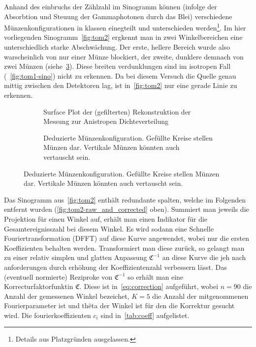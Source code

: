 \documentclass[slug=PET, room=Andreas-Schubert-Bau\,\ 424A, supervisor=Carsten\ Bittrich, coursedate=10.\ 01.\ 2020]{../../Lab_Report_LaTeX/lab_report}
\begin{document}
Anhand des einbruchs der Z\"ahlzahl im Sinogramm k\"onnen (infolge der
Absorbtion und Steuung der Gammaphotonen durch das Blei) verschiedene
M\"unzenkonfigurationen in klassen einegteilt und unterschieden
werden\footnote{Details aus Platzgr\"unden ausgelassen.}. Im hier
vorliegenden Sinogramm~\ref{fig:tom2} ergkennt man in zwei
Winkelbereichen eine unterschiedlich starke Abschw\"achung. Der erste,
hellere Bereich wurde also warscheinlich von nur einer M\"unze
blockiert, der zweite, dunklere demnach von zwei M\"unzen
(siehe~\ref{fig:munzen}). Diese breiten verdunklungen sind im
isotropen Fall (~\ref{fig:tom1-sino}) nicht zu erkennen. Da bei diesem
Versuch die Quelle genau mittig zwischen den Detektoren lag, ist
in~\ref{fig:tom2} nur eine gerade Linie zu erkennen.
\begin{figure}[h]
  \centering
  \begin{subfigure}{.4\textwidth}
    \centering
    \resizebox{0.8\textwidth}{!}{
      
    }
    \caption{Surface Plot der (gefilterten) Rekonstruktion der Messung zur Anistropen Dichteverteilung}
    \label{fig:tom2-3dplot}
  \end{subfigure}
  \begin{subfigure}{.4\textwidth}
    \centering

    \caption[M\"unzkonfiguration]{Deduzierte
      M\"unzenkonfiguration. Gef\"ullte Kreise stellen M\"unzen
      dar. Vertikale M\"unzen k\"onnten auch vertauscht sein.}
    \label{fig:munzen}
  \end{subfigure}
\end{figure}


Das Sinogramm aus~\ref{fig:tom2} enth\"alt redundante spalten, welche
im Folgenden entfernt wurden (\ref{fig:tom2-raw_and_corrected}
oben). Summiert man jeweils die Projektion f\"ur einen Winkel auf,
erh\"alt man einen Indikator f\"ur die Gesamtereignisszahl bei diesem
Winkel. Es wird sodann eine Schnelle Fouriertransformation (DFFT) auf
diese Kurve angewendet, wobei nur die ersten Koeffizienten behalten
werden.  Transformiert man diese zur\"uck, so gelangt man zu einer
relativ simplen und glatten Anpassung \(\mathfrak{C}^{-1}\) an diese
Kurve die jeh nach anforderungen durch erh\"ohung der
Koeffizientenzahl verbessern l\"asst. Das (eventuell normierte)
Reziproke von \(\mathfrak{C}^{-1}\) so erh\"alt man eine
Korrecturfaktorfunktin \(\mathfrak{C}\). Diese ist
in~\eqref{eq:correction} aufgef\"uhrt, wobei \(n=90\) die Anzahl der
gemessenen Winkel bezeichet, \(K=5\) die Anzahl der mitgenommenen
Fourierparameter ist und th\"eta der Winkel ist f\"ur den die
Korrektur gesucht wird. Die fourierkoeffizienten \(c_i\) sind
in~\ref{tab:coeff} aufgelistet.
\end{document}
